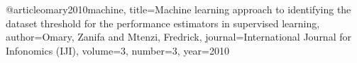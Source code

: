 @article{omary2010machine,
  title={Machine learning approach to identifying the dataset threshold for the performance estimators in supervised learning},
  author={Omary, Zanifa and Mtenzi, Fredrick},
  journal={International Journal for Infonomics (IJI)},
  volume={3},
  number={3},
  year={2010}
}